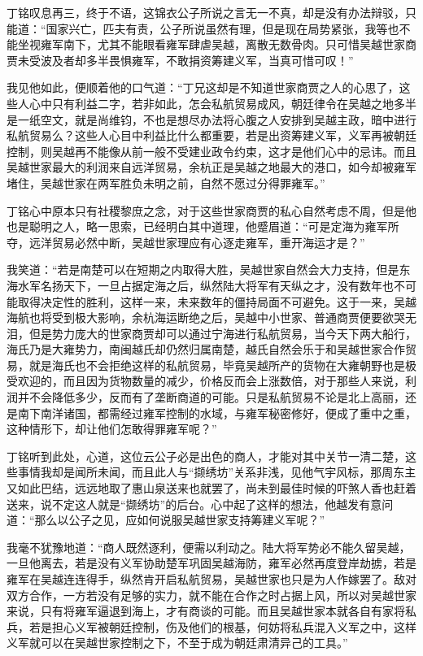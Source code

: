 丁铭叹息再三，终于不语，这锦衣公子所说之言无一不真，却是没有办法辩驳，只能道：“国家兴亡，匹夫有责，公子所说虽然有理，但是现在局势紧张，我等也不能坐视雍军南下，尤其不能眼看雍军肆虐吴越，离散无数骨肉。只可惜吴越世家商贾未受波及者却多半畏惧雍军，不敢捐资筹建义军，当真可惜可叹！”

我见他如此，便顺着他的口气道：“丁兄这却是不知道世家商贾之人的心思了，这些人心中只有利益二字，若非如此，怎会私航贸易成风，朝廷律令在吴越之地多半是一纸空文，就是尚维钧，不也是想尽办法将心腹之人安排到吴越主政，暗中进行私航贸易么？这些人心目中利益比什么都重要，若是出资筹建义军，义军再被朝廷控制，则吴越再不能像从前一般不受建业政令约束，这才是他们心中的忌讳。而且吴越世家最大的利润来自远洋贸易，余杭正是吴越之地最大的港口，如今却被雍军堵住，吴越世家在两军胜负未明之前，自然不愿过分得罪雍军。”

丁铭心中原本只有社稷黎庶之念，对于这些世家商贾的私心自然考虑不周，但是他也是聪明之人，略一思索，已经明白其中道理，他蹙眉道：“可是定海为雍军所夺，远洋贸易必然中断，吴越世家理应有心逐走雍军，重开海运才是？”

我笑道：“若是南楚可以在短期之内取得大胜，吴越世家自然会大力支持，但是东海水军名扬天下，一旦占据定海之后，纵然陆大将军有天纵之才，没有数年也不可能取得决定性的胜利，这样一来，未来数年的僵持局面不可避免。这于一来，吴越海航也将受到极大影响，余杭海运断绝之后，吴越中小世家、普通商贾便要欲哭无泪，但是势力庞大的世家商贾却可以通过宁海进行私航贸易，当今天下两大船行，海氏乃是大雍势力，南闽越氏却仍然归属南楚，越氏自然会乐于和吴越世家合作贸易，就是海氏也不会拒绝这样的私航贸易，毕竟吴越所产的货物在大雍朝野也是极受欢迎的，而且因为货物数量的减少，价格反而会上涨数倍，对于那些人来说，利润并不会降低多少，反而有了垄断商道的可能。只是私航贸易不论是北上高丽，还是南下南洋诸国，都需经过雍军控制的水域，与雍军秘密修好，便成了重中之重，这种情形下，却让他们怎敢得罪雍军呢？”

丁铭听到此处，心道，这位云公子必是出色的商人，才能对其中关节一清二楚，这些事情我却是闻所未闻，而且此人与“撷绣坊”关系非浅，见他气宇风标，那周东主又如此巴结，远远地取了惠山泉送来也就罢了，尚未到最佳时候的吓煞人香也赶着送来，说不定这人就是“撷绣坊”的后台。心中起了这样的想法，他越发有意问道：“那么以公子之见，应如何说服吴越世家支持筹建义军呢？”

我毫不犹豫地道：“商人既然逐利，便需以利动之。陆大将军势必不能久留吴越，一旦他离去，若是没有义军协助楚军巩固吴越海防，雍军必然再度登岸劫掳，若是雍军在吴越连连得手，纵然肯开启私航贸易，吴越世家也只是为人作嫁罢了。敌对双方合作，一方若没有足够的实力，就不能在合作之时占据上风，所以对吴越世家来说，只有将雍军逼退到海上，才有商谈的可能。而且吴越世家本就各自有家将私兵，若是担心义军被朝廷控制，伤及他们的根基，何妨将私兵混入义军之中，这样义军就可以在吴越世家控制之下，不至于成为朝廷肃清异己的工具。”

